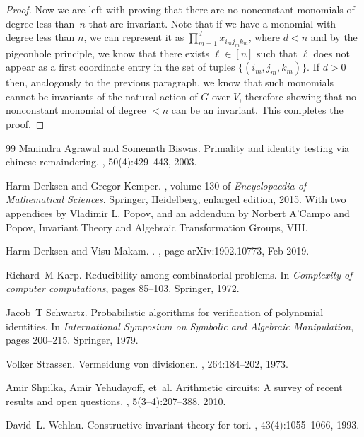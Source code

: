 \documentclass[10pt,a4paper]{article}
\begin{document}
\begin{proof}
	Now we are left with proving that there are no nonconstant monomials of degree less than~$n$ that are invariant.
  Note that if we have a monomial with degree less than $n$, we can represent it as
	$\prod_{m=1}^d x_{i_m j_m k_m}$, where $d < n$ and by the pigeonhole principle, we know that
	there exists $\ell \in [n]$ such that $\ell$ does not appear as a first coordinate entry in
	the set of tuples $\{(i_m, j_m, k_m)\}$. If $d>0$ then, analogously to the previous paragraph, we know
	that such monomials cannot be invariants of the natural action of $G$ over $V$, therefore showing
	that no nonconstant monomial of degree $< n$ can be an invariant. This completes the proof.
\end{proof}






\begin{thebibliography}{99}
Manindra Agrawal and Somenath Biswas.
\newblock Primality and identity testing via chinese remaindering.
, 50(4):429--443, 2003.

Harm Derksen and Gregor Kemper.
, volume 130 of {\em
  Encyclopaedia of Mathematical Sciences}.
\newblock Springer, Heidelberg, enlarged edition, 2015.
\newblock With two appendices by Vladimir L. Popov, and an addendum by Norbert
  A'Campo and Popov, Invariant Theory and Algebraic Transformation Groups,
  VIII.

Harm {Derksen} and Visu {Makam}.
.
, page arXiv:1902.10773, Feb 2019.

Richard~M Karp.
\newblock Reducibility among combinatorial problems.
\newblock In {\em Complexity of computer computations}, pages 85--103.
  Springer, 1972.

Jacob~T Schwartz.
\newblock Probabilistic algorithms for verification of polynomial identities.
\newblock In {\em International Symposium on Symbolic and Algebraic
  Manipulation}, pages 200--215. Springer, 1979.

Volker Strassen.
\newblock Vermeidung von divisionen.
,
  264:184--202, 1973.

Amir Shpilka, Amir Yehudayoff, et~al.
\newblock Arithmetic circuits: A survey of recent results and open questions.
, 5(3--4):207--388, 2010.

David~L. Wehlau.
\newblock Constructive invariant theory for tori.
, 43(4):1055--1066, 1993.

\end{thebibliography}
\end{document}
